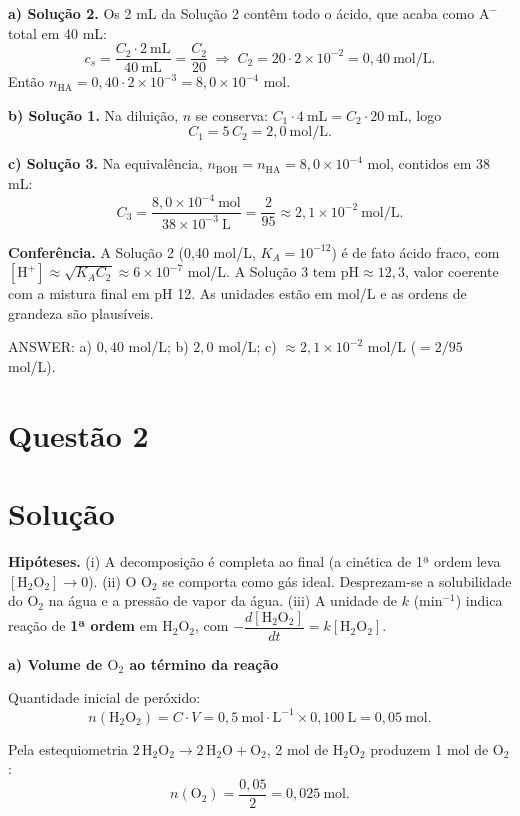 \documentclass{article}%
\begin{document}
\medskip
\textbf{a) Solução 2.} Os 2 mL da Solução 2 contêm todo o ácido, que acaba como $\mathrm{A^-}$ total em 40 mL:
\[
c_s=\frac{C_2\cdot 2\ \text{mL}}{40\ \text{mL}}=\frac{C_2}{20}
\;\Rightarrow\;
C_2=20\cdot 2\times10^{-2}=\boxed{0{,}40\ \text{mol/L}}.
\]
Então $n_{\mathrm{HA}}=0{,}40\cdot 2\times10^{-3}=8{,}0\times10^{-4}$ mol.

\textbf{b) Solução 1.} Na diluição, $n$ se conserva: $C_1\cdot 4\ \text{mL}=C_2\cdot 20\ \text{mL}$, logo
\[
C_1=5\,C_2=\boxed{2{,}0\ \text{mol/L}}.
\]

\textbf{c) Solução 3.} Na equivalência, $n_{\mathrm{BOH}}=n_{\mathrm{HA}}=8{,}0\times10^{-4}$ mol, contidos em 38 mL:
\[
C_3=\frac{8{,}0\times10^{-4}\ \text{mol}}{38\times10^{-3}\ \text{L}}=\frac{2}{95}\approx\boxed{2{,}1\times10^{-2}\ \text{mol/L}}.
\]

\medskip
\textbf{Conferência.} A Solução 2 (0,40 mol/L, $K_A=10^{-12}$) é de fato ácido fraco, com $[\mathrm{H^+}]\approx\sqrt{K_A C_2}\approx 6\times10^{-7}$ mol/L. A Solução 3 tem $\mathrm{pH}\approx 12{,}3$, valor coerente com a mistura final em pH 12. As unidades estão em mol/L e as ordens de grandeza são plausíveis.

\medskip
ANSWER: a) $0{,}40$ mol/L; b) $2{,}0$ mol/L; c) $\approx 2{,}1\times10^{-2}$ mol/L ($=2/95$ mol/L).%
\newpage%
\section*{Questão 2}

\section*{Solução}

\textbf{Hipóteses.} (i) A decomposição é completa ao final (a cinética de 1ª ordem leva $[\mathrm{H_2O_2}]\to 0$). (ii) O $\mathrm{O_2}$ se comporta como gás ideal. Desprezam-se a solubilidade do $\mathrm{O_2}$ na água e a pressão de vapor da água. (iii) A unidade de $k$ ($\text{min}^{-1}$) indica reação de \textbf{1ª ordem} em $\mathrm{H_2O_2}$, com $-\dfrac{d[\mathrm{H_2O_2}]}{dt}=k[\mathrm{H_2O_2}]$.

\medskip
\textbf{a) Volume de $\mathrm{O_2}$ ao término da reação}

Quantidade inicial de peróxido:
\[
n(\mathrm{H_2O_2})=C\cdot V=0{,}5\ \text{mol}\cdot\text{L}^{-1}\times 0{,}100\ \text{L}=0{,}05\ \text{mol}.
\]

Pela estequiometria $2\,\mathrm{H_2O_2}\to 2\,\mathrm{H_2O}+\mathrm{O_2}$, 2 mol de $\mathrm{H_2O_2}$ produzem 1 mol de $\mathrm{O_2}$:
\[
n(\mathrm{O_2})=\frac{0{,}05}{2}=0{,}025\ \text{mol}.
\]
\end{document}
